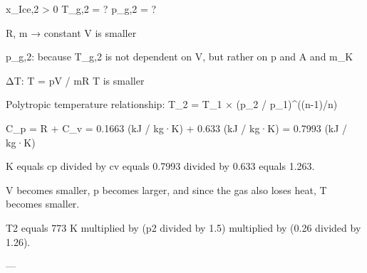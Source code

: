 x_Ice,2 > 0  
T_g,2 = ?  
p_g,2 = ?  

R, m → constant  
V is smaller  

p_g,2: because T_g,2 is not dependent on V, but rather on p and A and m_K  

ΔT: T = pV / mR  
T is smaller  

Polytropic temperature relationship:  
T_2 = T_1 × (p_2 / p_1)^((n-1)/n)  

C_p = R + C_v = 0.1663 (kJ / kg·K) + 0.633 (kJ / kg·K) = 0.7993 (kJ / kg·K)

K equals cp divided by cv equals 0.7993 divided by 0.633 equals 1.263.  

V becomes smaller, p becomes larger, and since the gas also loses heat, T becomes smaller.  

T2 equals 773 K multiplied by (p2 divided by 1.5) multiplied by (0.26 divided by 1.26).  

---